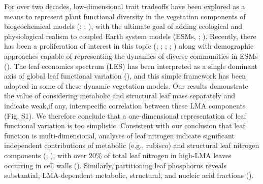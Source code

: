 \documentclass[
  12pt,
  letterpaper,
  DIV=11,
  numbers=noendperiod]{scrartcl}
\begin{document}
For over two decades, low-dimensional trait tradeoffs have been explored
as a means to represent plant functional diversity in the vegetation
components of biogeochemical models
(;
;
), with the ultimate
goal of adding ecological and physiological realism to coupled Earth
system models (ESMs, ;
). Recently,
there has been a proliferation of interest in this topic
(;
;
;
;
) along
with demographic approaches capable of representing the dynamics of
diverse communities in ESMs (). The leaf economics spectrum (LES) has been interpreted as a
single dominant axis of global leaf functional variation
(), and this simple
framework has been adopted in some of these dynamic vegetation models.
Our results demonstrate the value of considering metabolic and
structural leaf mass separately and indicate weak,if any, interspecific
correlation between these LMA components (Fig. S1). We therefore
conclude that a one-dimensional representation of leaf functional
variation is too simplistic. Consistent with our conclusion that leaf
function is multi-dimensional, analyses of leaf nitrogen indicate
significant independent contributions of metabolic (e.g., rubisco) and
structural leaf nitrogen components (, ), with over 20\% of total leaf
nitrogen in high-LMA leaves occurring in cell walls
(). Similarly, partitioning
leaf phosphorus reveals substantial, LMA-dependent metabolic,
structural, and nucleic acid fractions
().
\end{document}

